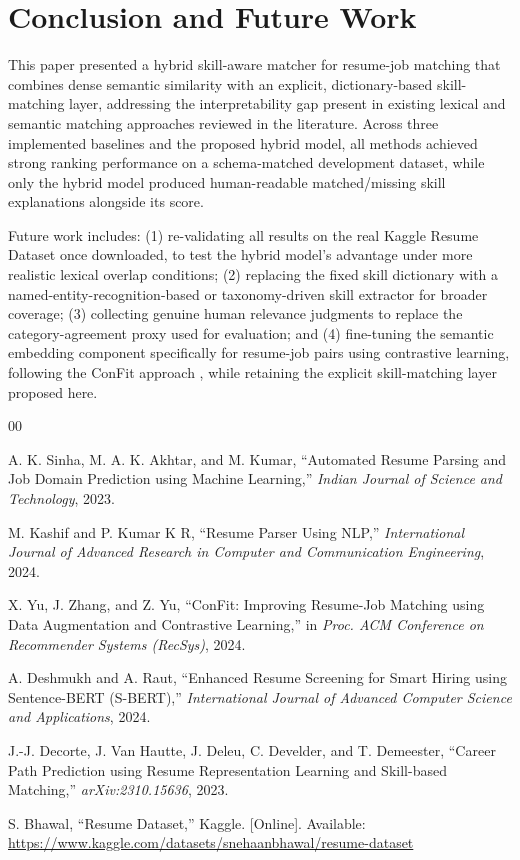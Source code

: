 \documentclass[conference]{IEEEtran}
\begin{document}
\section{Conclusion and Future Work}

This paper presented a hybrid skill-aware matcher for resume-job matching that combines dense semantic similarity with an explicit, dictionary-based skill-matching layer, addressing the interpretability gap present in existing lexical and semantic matching approaches reviewed in the literature. Across three implemented baselines and the proposed hybrid model, all methods achieved strong ranking performance on a schema-matched development dataset, while only the hybrid model produced human-readable matched/missing skill explanations alongside its score.

Future work includes: (1) re-validating all results on the real Kaggle Resume Dataset once downloaded, to test the hybrid model's advantage under more realistic lexical overlap conditions; (2) replacing the fixed skill dictionary with a named-entity-recognition-based or taxonomy-driven skill extractor for broader coverage; (3) collecting genuine human relevance judgments to replace the category-agreement proxy used for evaluation; and (4) fine-tuning the semantic embedding component specifically for resume-job pairs using contrastive learning, following the ConFit approach \cite{yu2024confit}, while retaining the explicit skill-matching layer proposed here.

\begin{thebibliography}{00}

 A. K. Sinha, M. A. K. Akhtar, and M. Kumar, ``Automated Resume Parsing and Job Domain Prediction using Machine Learning,'' \emph{Indian Journal of Science and Technology}, 2023.

 M. Kashif and P. Kumar K R, ``Resume Parser Using NLP,'' \emph{International Journal of Advanced Research in Computer and Communication Engineering}, 2024.

 X. Yu, J. Zhang, and Z. Yu, ``ConFit: Improving Resume-Job Matching using Data Augmentation and Contrastive Learning,'' in \emph{Proc. ACM Conference on Recommender Systems (RecSys)}, 2024.

 A. Deshmukh and A. Raut, ``Enhanced Resume Screening for Smart Hiring using Sentence-BERT (S-BERT),'' \emph{International Journal of Advanced Computer Science and Applications}, 2024.

 J.-J. Decorte, J. Van Hautte, J. Deleu, C. Develder, and T. Demeester, ``Career Path Prediction using Resume Representation Learning and Skill-based Matching,'' \emph{arXiv:2310.15636}, 2023.

 S. Bhawal, ``Resume Dataset,'' Kaggle. [Online]. Available: \url{https://www.kaggle.com/datasets/snehaanbhawal/resume-dataset}

\end{thebibliography}
\end{document}
